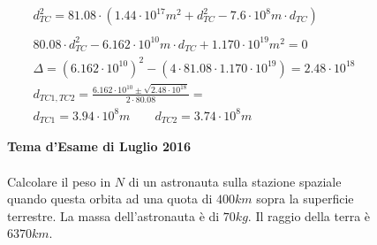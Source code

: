 \begin{figure}[h!]
{{\begin{gather*}
            d_{TC}^2=81.08 \cdot (1.44 \cdot 10^{17}m^2 + d_{TC}^2 - 7.6\cdot 10^8m \cdot d_{TC})\\ \\
            80.08\cdot d_{TC}^2 -6.162\cdot 10^{10}m \cdot d_{TC} + 1.170\cdot 10^{19}m^2 = 0\\ 
            \Delta =(6.162\cdot 10^{10})^2 -(4 \cdot 81.08 \cdot 1.170\cdot 10^{19})=2.48\cdot 10^{18}\\
            d_{TC1, TC2}= \frac{6.162\cdot 10^{10} \pm \sqrt{2.48\cdot 10^{18}}}{2\cdot 80.08}=\\
            d_{TC1}=3.94 \cdot 10^8m  \qquad d_{TC2}=3.74 \cdot 10^8m
        \end{gather*}
        
           
    }
}	
\end{figure}

\begin{figure}[h!]
\textbf{Tema d'Esame di Luglio 2016}\\ \\
Calcolare il peso in $N$ di un astronauta sulla stazione spaziale quando questa orbita ad una quota di $400 km$ sopra la superficie terrestre. La massa dell'astronauta è di $70 kg$. Il raggio della terra è $6370 km$.\\ \\

\end{figure}